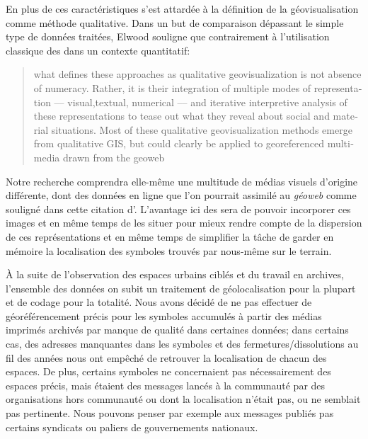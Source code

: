 En plus de ces caractéristiques \citet{Elwood2011} s'est attardée à la définition de la géovisualisation comme méthode qualitative. 
Dans un but de comparaison dépassant le simple type de données traitées, Elwood souligne que contrairement à l'utilisation classique des \sig{} dans un contexte quantitatif: \foreignblockquote{english}[{\cite{Elwood2011}}][.]{\textelp{} what defines   these approaches as qualitative geovisualization is not absence of numeracy.
  Rather, it is their integration of multiple modes of representation –--  visual,textual, numerical --– and iterative interpretive analysis of these representations to tease out what they reveal about social and material situations. 
Most of these qualitative geovisualization methods emerge from qualitative GIS, but could clearly be applied to georeferenced multimedia drawn from the geoweb}. 
Notre recherche comprendra elle-même une multitude de médias visuels d'origine différente, dont des données en ligne que l'on pourrait assimilé au \emph{géoweb} comme souligné dans cette citation d'\citeauthor{Elwood2011}. 
L'avantage ici des \sig{} sera de pouvoir incorporer ces images et en même temps de les situer pour mieux rendre compte de la dispersion de ces représentations et en même temps de simplifier la tâche de garder en mémoire la localisation des symboles trouvés par nous-même sur le terrain.

À la suite de l'observation des espaces urbains ciblés et du travail en archives, l'ensemble des données on subit un traitement de géolocalisation pour la plupart et de codage pour la totalité. 
Nous avons décidé de ne pas effectuer de géoréférencement précis pour les symboles accumulés à partir des médias imprimés archivés par manque de qualité dans certaines données; dans certains cas, des adresses manquantes dans les symboles et des fermetures/dissolutions au fil des années nous ont empêché de retrouver la localisation de chacun des espaces. 
De plus, certains symboles ne concernaient pas nécessairement des espaces précis, mais étaient des messages lancés à la communauté par des organisations hors communauté ou dont la localisation n'était pas, ou ne semblait pas  pertinente. 
Nous pouvons penser par exemple aux messages publiés pas certains syndicats ou paliers de gouvernements nationaux.

